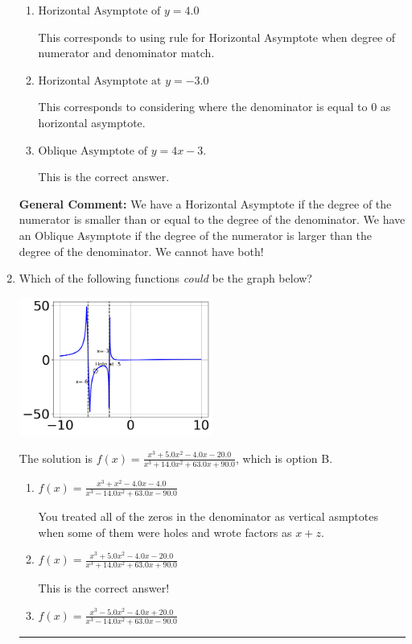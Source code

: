 \documentclass{extbook}[14pt]
\newcommand{\litem}[1]{\item #1

\rule{\textwidth}{0.4pt}}
\begin{document}
\begin{enumerate}
{\begin{enumerate}[label=\Alph*.]
This corresponds to believing there can be both a horizontal and oblique asymptote.
\item \( \text{Horizontal Asymptote of } y = 4.0  \)

This corresponds to using rule for Horizontal Asymptote when degree of numerator and denominator match.
\item \( \text{Horizontal Asymptote at } y = -3.0 \)

This corresponds to considering where the denominator is equal to 0 as horizontal asymptote.
\item \( \text{Oblique Asymptote of } y = 4x -3. \)

This is the correct answer.
\end{enumerate}

\textbf{General Comment:} We have a Horizontal Asymptote if the degree of the numerator is smaller than or equal to the degree of the denominator. We have an Oblique Asymptote if the degree of the numerator is larger than the degree of the denominator. We cannot have both!
}
\litem{
Which of the following functions \textit{could} be the graph below?

\begin{center}
    \includegraphics[width=0.5\textwidth]{../Figures/identifyGraphOfRationalFunctionCopyB.png}
\end{center}


The solution is \( f(x)=\frac{x^{3} +5.0 x^{2} -4.0 x -20.0}{x^{3} +14.0 x^{2} +63.0 x + 90.0} \), which is option B.\begin{enumerate}[label=\Alph*.]
\item \( f(x)=\frac{x^{3} + x^{2} -4.0 x -4.0}{x^{3} -14.0 x^{2} +63.0 x -90.0} \)

You treated all of the zeros in the denominator as vertical asmptotes when some of them were holes and wrote factors as $x+z$.
\item \( f(x)=\frac{x^{3} +5.0 x^{2} -4.0 x -20.0}{x^{3} +14.0 x^{2} +63.0 x + 90.0} \)

This is the correct answer!
\item \( f(x)=\frac{x^{3} -5.0 x^{2} -4.0 x + 20.0}{x^{3} -14.0 x^{2} +63.0 x -90.0} \)


\end{enumerate}}
\end{enumerate}
\end{document}

